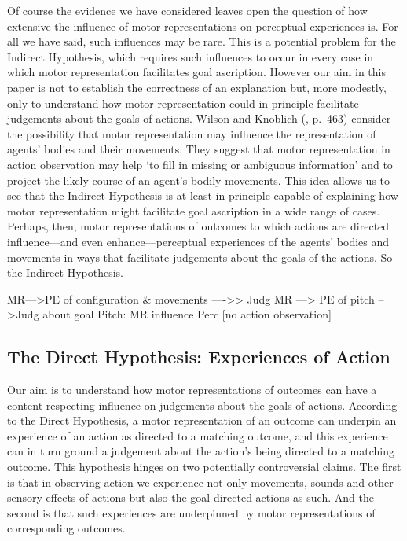 \documentclass[12pt,\papersize]{extarticle}
\begin{document}
Of course the evidence we have considered leaves open the question of how extensive the influence of motor representations on perceptual experiences is.  For all we have said, such influences may be rare.  This is a potential problem for the Indirect Hypothesis, which requires such influences to occur in every case in which motor representation facilitates goal ascription.  However our aim in this paper is not to establish the correctness of an explanation but, more modestly, only to understand how motor representation could in principle facilitate judgements about the goals of actions.  Wilson and Knoblich (\citeyear{Wilson:2005qu}, p.\ 463) consider the possibility that motor representation may influence the representation of agents' bodies and their movements. They suggest that motor representation in action observation may help `to fill in missing or ambiguous information' and to project the likely course of an agent's bodily movements. This idea allows us to see that the Indirect Hypothesis is at least in principle capable of explaining how motor representation might facilitate goal ascription in a wide range of cases. Perhaps, then, motor representations of outcomes to which actions are directed influence---and even enhance---perceptual experiences of the agents' bodies and movements in ways that facilitate judgements about the goals of the actions.  So the Indirect Hypothesis.


MR--->PE of configuration \& movements ---->> Judg
MR ---> PE of pitch -->Judg about goal
Pitch: MR influence Perc [no action observation]



\subsection{The Direct Hypothesis: Experiences of Action}
Our aim is to understand how motor representations of outcomes can have a content-respecting influence on judgements about the goals of actions. 
According to the Direct Hypothesis, a motor representation of an outcome can underpin an experience of an action as directed to a matching outcome, and this experience can in turn ground a judgement about the action's being directed to a matching outcome.  This hypothesis hinges on two potentially controversial claims.  The first is that in observing action we experience not only movements, sounds and other sensory effects of actions but also the goal-directed actions as such. And the second is that such experiences are underpinned by motor representations of corresponding outcomes.  
\end{document}
